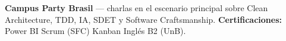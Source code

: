 
\medskip
{}
\textbf{Campus Party Brasil} — charlas en el escenario principal sobre Clean Architecture, TDD, IA, SDET y Software Craftsmanship.
\divider
\textbf{Certificaciones:} Power BI \textbullet{} Scrum (SFC) \textbullet{} Kanban \textbullet{} Inglés B2 (UnB).

